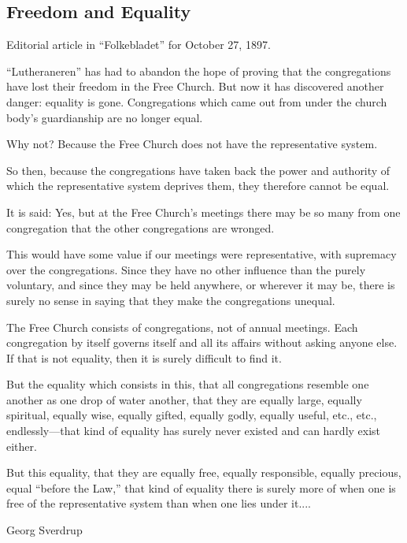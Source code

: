
\subsection{Freedom and Equality}

Editorial article in “Folkebladet” for October 27, 1897.

“Lutheraneren” has had to abandon the hope of proving that the congregations have lost their freedom in the Free Church. But now it has discovered another danger: equality is gone. Congregations which came out from under the church body’s guardianship are no longer equal.

Why not? Because the Free Church does not have the representative system.

So then, because the congregations have taken back the power and authority of which the representative system deprives them, they therefore cannot be equal.

It is said: Yes, but at the Free Church’s meetings there may be so many from one congregation that the other congregations are wronged.

This would have some value if our meetings were representative, with supremacy over the congregations. Since they have no other influence than the purely voluntary, and since they may be held anywhere, or wherever it may be, there is surely no sense in saying that they make the congregations unequal.

The Free Church consists of congregations, not of annual meetings. Each congregation by itself governs itself and all its affairs without asking anyone else. If that is not equality, then it is surely difficult to find it.

But the equality which consists in this, that all congregations resemble one another as one drop of water another, that they are equally large, equally spiritual, equally wise, equally gifted, equally godly, equally useful, etc., etc., endlessly—that kind of equality has surely never existed and can hardly exist either.

But this equality, that they are equally free, equally responsible, equally precious, equal “before the Law,” that kind of equality there is surely more of when one is free of the representative system than when one lies under it....

Georg Sverdrup
